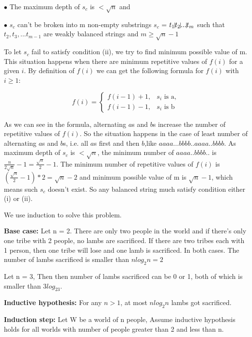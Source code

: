 \documentclass[12pt,a4paper]{article}
\newcommand{\question}[1]{\bigskip\noindent{\textbf{Q{#1} solution}}}
\begin{document}
$\bullet$ The maximum depth of $s_c$ is $<\sqrt{n}$ and 

$\bullet$ $s_c$ can't be broken into m non-empty substrings $s_c$ = $t_1\vline t_2\vline ... \vline t_m$ such that $t_2,t_3,...t_{m-1}$ are weakly balanced strings and $m \ge \sqrt{n} - 1$

To let $s_c$ fail to satisfy condition (ii), we try to find minimum possible value of m. This situation happens when there are minimum repetitive values of $f(i)$ for a given $i$. By definition of $f(i)$ we can get the following formula for $f(i)$ with $i \ge 1$:

\begin{equation*}
	f(i)=
	\begin{cases}
		f(i - 1) + 1, & s_i \mbox{ is a},\\
		f(i - 1) - 1, & s_i \mbox{ is b}
	\end{cases}
\end{equation*}

As we can see in the formula, alternating $a$s and $b$s increase the number of repetitive values of $f(i)$. So the situation happens in the case of least number of alternating $a$s and $b$s, i.e. all $a$s first and then $b$,like $aaaa...bbbb..aaaa..bbbb$. As maximum depth of $s_c$ is $<\sqrt{n}$, the minimum number of $aaaa..bbbb..$ is $ \frac{n}{2\sqrt{n}} - 1 = \frac{\sqrt{n}}{2} - 1$. The minimum number of repetitive values of $f(i)$ is ${ (\frac{\sqrt{n}}{2} - 1) * 2} = \sqrt{n} - 2$ and minimum possible value of m is $\sqrt{n} - 1$, which means such $s_c$ doesn't exist. So any balanced string much satisfy condition either (i) or (ii).

\question{2}

We use induction to solve this problem. 

\textbf{Base case:} Let n = 2. There are only two people in the world and if there's only one tribe with 2 people, no lambs are sacrificed. If there are two tribes each with 1 person, then one tribe will lose and one lamb is sacrificed. In both cases. The number of lambs sacrificed is smaller than $nlog_2n = 2$

Let n = 3, Then then number of lambs sacrificed can be 0 or 1, both of which is smaller than $3log_23$.

\textbf{Inductive hypothesis:} For any $n > 1$, at most $nlog_2n$ lambs got sacrificed.

\textbf{Induction step:} Let W be a world of n people, Assume inductive hypothesis holds for all worlds with number of people greater than 2 and less than n.
\end{document}
